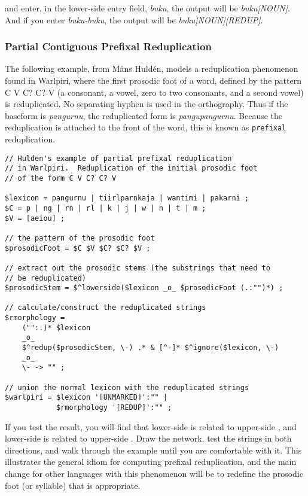 \noindent
and enter, in the lower-side entry field, \emph{buku}, the output will
be \emph{buku[NOUN]}.  And if you enter
\emph{buku-buku}, the output will be \emph{buku[NOUN][REDUP]}.


\subsubsection{Partial Contiguous Prefixal Reduplication}

The following example, from M\r{a}ns Huldén, models a reduplication
phenomenon found in Warlpiri,
where the first prosodic foot of a word, defined by the pattern C V C? C? V (a consonant, a vowel,
zero to two consonants, and a second vowel) is reduplicated.  No separating
hyphen is used in the orthography.  Thus if the
baseform is \emph{pangurnu}, the reduplicated form is \emph{pangupangurnu}.  Because the
reduplication is attached to the front of the word, this is known as \verb!prefixal!
reduplication.

\begin{Verbatim}
// Hulden's example of partial prefixal reduplication 
// in Warlpiri.  Reduplication of the initial prosodic foot 
// of the form C V C? C? V

$lexicon = pangurnu | tiirlparnkaja | wantimi | pakarni ;
$C = p | ng | rn | rl | k | j | w | n | t | m ;
$V = [aeiou] ;

// the pattern of the prosodic foot
$prosodicFoot = $C $V $C? $C? $V ;

// extract out the prosodic stems (the substrings that need to
// be reduplicated)
$prosodicStem = $^lowerside($lexicon _o_ $prosodicFoot (.:"")*) ;

// calculate/construct the reduplicated strings
$rmorphology = 
	("":.)* $lexicon
    _o_
    $^redup($prosodicStem, \-) .* & [^-]* $^ignore($lexicon, \-)
    _o_
    \- -> "" ;

// union the normal lexicon with the reduplicated strings
$warlpiri = $lexicon '[UNMARKED]':"" | 
            $rmorphology '[REDUP]':"" ;
\end{Verbatim}

If you test the result, you will find that lower-side  is
related to upper-side , and
lower-side  is related to upper-side
.  Draw the network, test the
strings in both directions, and walk through the example until you are comfortable with it.  This
illustrates the general idiom for computing prefixal reduplication, and the main change for other languages
with this phenomenon will be to redefine the prosodic foot (or syllable) that is appropriate.


